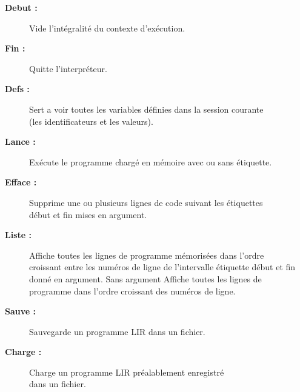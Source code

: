 \begin{description}
	\item[\textbf{Debut :}] Vide l'intégralité du contexte d'exécution.
	
	\item[\textbf{Fin :}] Quitte l'interpréteur.
	
	\item[\textbf{Defs :}] Sert a voir toutes les variables définies dans la session courante\\ (les identificateurs et les valeurs).
	
	\item[\textbf{Lance :}] Exécute le programme chargé en mémoire avec ou sans étiquette.
	
	\item[\textbf{Efface :}] Supprime une ou plusieurs lignes de code suivant les étiquettes \\ début et fin mises en argument.
	
	\item[\textbf{Liste :}] Affiche toutes les lignes de programme mémorisées dans l'ordre\\ croissant entre les numéros de ligne de l'intervalle étiquette début et fin donné en argument. Sans argument Affiche toutes les lignes de \\programme dans l'ordre croissant des numéros de ligne.
	
	\item[\textbf{Sauve :}] Sauvegarde un programme LIR dans un fichier.
	
	\item[\textbf{Charge :}] Charge un programme LIR préalablement enregistré \\ dans un fichier.

\end{description} 